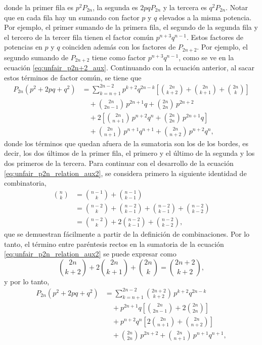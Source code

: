 \documentclass[a4paper]{report}
\begin{document}
\normalsize
donde la primer fila es \(p^2P_{2n}\), la segunda es \(2pqP_{2n}\) y la tercera es \(q^2P_{2n}\). Notar que en cada fila hay un sumando con factor \(p\) y \(q\) elevados a la misma potencia. Por ejemplo, el primer sumando de la primera fila, el segundo de la segunda fila y el tercero de la tercer fila tienen el factor común \(p^{n+3}q^{n-1}\). Estos factores de potencias en \(p\) y \(q\) coinciden además con los factores de \(P_{2n+2}\). Por ejemplo, el segundo sumando de \(P_{2n+2}\) tiene como factor \(p^{n+3}q^{n-1}\), como se ve en la ecuación \ref{eq:unfair_p2n+2_aux}. Continuando con la ecuación anterior, al sacar estos términos de factor común, se tiene que
\begin{align}\label{eq:unfair_p2n_relation_aux2}
 P_{2n}(p^2+2pq+q^2)&=\sum_{k=n+1}^{2n-2}p^{k+2}q^{2n-k}\left[\binom{2n}{k+2}+\binom{2n}{k+1}+\binom{2n}{k}\right]\nonumber\\
 &\quad+\binom{2n}{2n-1}\,p^{2n+1}q+\binom{2n}{2n}\,p^{2n+2}\nonumber\\
 &\quad+2\left[\binom{2n}{n+1}\,p^{n+2}q^{n}+\binom{2n}{2n}\,p^{2n+1}q\right]\nonumber\\
 &\quad+\binom{2n}{n+1}\,p^{n+1}q^{n+1}+\binom{2n}{n+2}\,p^{n+2}q^{n},
\end{align}
donde los términos que quedan afuera de la sumatoria son los de los bordes, es decir, los dos últimos de la primer fila, el primero y el último de la segunda y los dos primeros de la tercera. Para continuar con el desarrollo de la ecuación \ref{eq:unfair_p2n_relation_aux2}, se considera primero la siguiente identidad de combinatoria,
\begin{align*}
 \binom{n}{k}&=\binom{n-1}{k}+\binom{n-1}{k-1}\\
  &=\binom{n-2}{k}+\binom{n-2}{k-1}+\binom{n-2}{k-1}+\binom{n-2}{k-2}\\
  &=\binom{n-2}{k}+2\binom{n-2}{k-1}+\binom{n-2}{k-2},
\end{align*}
que se demuestran fácilmente a partir de la definición de combinaciones. Por lo tanto, el término entre paréntesis rectos en la sumatoria de la ecuación \ref{eq:unfair_p2n_relation_aux2} se puede expresar como
\begin{equation}\label{eq:unfair_combination_prop}
 \binom{2n}{k+2}+2\binom{2n}{k+1}+\binom{2n}{k}=\binom{2n+2}{k+2},
\end{equation}
y por lo tanto,
\begin{align*}
 P_{2n}(p^2+2pq+q^2)&=\sum_{k=n+1}^{2n-2}\binom{2n+2}{k+2}\,p^{k+2}q^{2n-k}\\
 &\quad+p^{2n+1}q\left[\binom{2n}{2n-1}+2\binom{2n}{2n}\right]\\
 &\quad+p^{n+2}q^{n}\left[2\binom{2n}{n+1}+\binom{2n}{n+2}\right]\\
 &\quad+\binom{2n}{2n}\,p^{2n+2}+\binom{2n}{n+1}\,p^{n+1}q^{n+1},
\end{align*}
\end{document}
